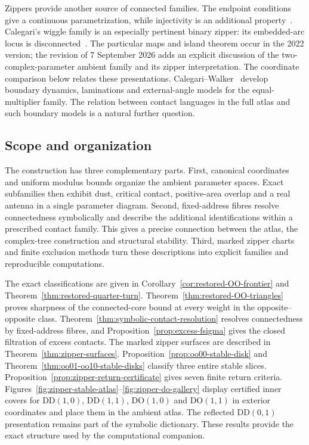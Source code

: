 \documentclass[11pt,a4paper]{article}
\theoremstyle{plain}
\theoremstyle{definition}
\theoremstyle{remark}
\begin{document}
Zippers provide another source of connected families. The endpoint conditions
give a continuous parametrization, while injectivity is an additional
property~\cite{Aseev2003,RaoZhang2019}. Calegari's wiggle family is an especially pertinent
binary zipper: its embedded-arc locus is disconnected~\cite{Calegari2026}.
The particular maps and island theorem occur in the 2022 version; the revision
of 7 September 2026 adds an explicit discussion of the two-complex-parameter
ambient family and its zipper interpretation. The coordinate comparison below
relates these presentations. Calegari--Walker~\cite{CalegariWalker2026} develop boundary dynamics,
laminations and external-angle models for the equal-multiplier family. The
relation between contact languages in the full atlas and such boundary models
is a natural further question.

\subsection{Scope and organization}
The construction has three complementary parts. First, canonical coordinates
and uniform modulus bounds organize the ambient parameter spaces. Exact
subfamilies then exhibit dust, critical contact, positive-area overlap and a
real antenna in a single parameter diagram. Second, fixed-address fibres resolve
connectedness symbolically and describe the additional identifications within
a prescribed contact family. This gives a precise connection between the atlas,
the complex-tree construction and structural stability. Third, marked zipper
charts and finite exclusion methods turn these descriptions into explicit
families and reproducible computations.

The exact classifications are given in
Corollary~\ref{cor:restored-OO-frontier} and
Theorem~\ref{thm:restored-quarter-turn}. Theorem~\ref{thm:restored-OO-triangles}
proves sharpness of the connected-core bound at every weight in the opposite--opposite
class. Theorem~\ref{thm:symbolic-contact-resolution} resolves connectedness by
fixed-address fibres, and Proposition~\ref{prop:excess-fsigma} gives the closed
filtration of excess contacts. The marked zipper surfaces are described in
Theorem~\ref{thm:zipper-surfaces}. Proposition~\ref{prop:oo00-stable-disk}
and Theorem~\ref{thm:oo01-oo10-stable-disks} classify three entire stable
slices. Proposition~\ref{prop:zipper-return-certificate} gives seven finite
return criteria. Figures~\ref{fig:zipper-stable-atlas}--\ref{fig:zipper-do-gallery}
display certified inner covers for DD$(1,0)$, DD$(1,1)$, DO$(1,0)$ and
DO$(1,1)$ in exterior coordinates and place them in the ambient atlas.
The reflected DD$(0,1)$ presentation remains part of the symbolic
dictionary. These results provide the exact structure used by the
computational companion.
\end{document}
